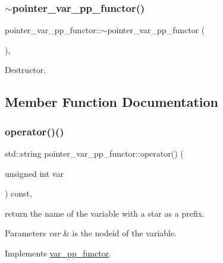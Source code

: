 \subsubsection{\texorpdfstring{$\sim$pointer\+\_\+var\+\_\+pp\+\_\+functor()}{~pointer\_var\_pp\_functor()}}
{\footnotesize\ttfamily pointer\+\_\+var\+\_\+pp\+\_\+functor\+::$\sim$pointer\+\_\+var\+\_\+pp\+\_\+functor (\begin{DoxyParamCaption}{ }\end{DoxyParamCaption})\hspace{0.3cm}{\ttfamily [override]}, {\ttfamily [default]}}



Destructor. 



\subsection{Member Function Documentation}
\mbox{\label{structpointer__var__pp__functor_a89023532351352a1ce6a9d40d9ec5e2c}} 
\subsubsection{\texorpdfstring{operator()()}{operator()()}}
{\footnotesize\ttfamily std\+::string pointer\+\_\+var\+\_\+pp\+\_\+functor\+::operator() (\begin{DoxyParamCaption}\item[{unsigned int}]{var }\end{DoxyParamCaption}) const\hspace{0.3cm}{\ttfamily [override]}, {\ttfamily [virtual]}}



return the name of the variable with a star as a prefix. 


\begin{DoxyParams}{Parameters}
{\em var} & is the nodeid of the variable. \\
\hline
\end{DoxyParams}


Implements \hyperlink{structvar__pp__functor_a6bcbd4e1551ac2584638ef70ecc6f361}{var\+\_\+pp\+\_\+functor}.



